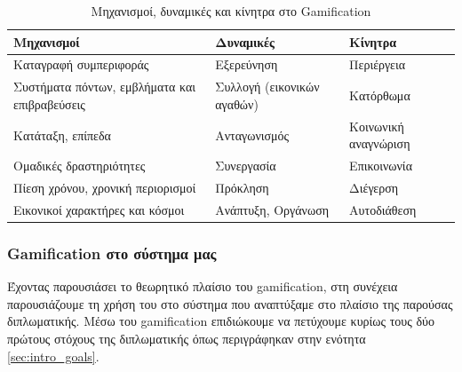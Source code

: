	\begin{table}[H]
		\begin{center}
		    \begin{tabular}{|l|l|l|}
		    \hline
		    \rowcolor{grayy}
		    \textbf{Μηχανισμοί} & \textbf{Δυναμικές} & \textbf{Κίνητρα}
		    \\ \hline
		     Καταγραφή συμπεριφοράς & Εξερεύνηση & Περιέργεια   
		     \\ \hline
		     Συστήματα πόντων, εμβλήματα και επιβραβεύσεις & Συλλογή (εικονικών αγαθών) & Κατόρθωμα
		     \\ \hline
		     Κατάταξη, επίπεδα & Ανταγωνισμός & Κοινωνική αναγνώριση
		     \\ \hline
		     Ομαδικές δραστηριότητες & Συνεργασία & Επικοινωνία
		     \\ \hline
		     Πίεση χρόνου, χρονική περιορισμοί & Πρόκληση & Διέγερση
		     \\ \hline
		     Εικονικοί χαρακτήρες και κόσμοι & Ανάπτυξη, Οργάνωση & Αυτοδιάθεση
		     \\ \hline
		    \end{tabular}
		    \caption{Μηχανισμοί, δυναμικές και κίνητρα στο Gamification}
			\label{tab:gamifaction_dynamics}
		\end{center}
	\end{table}
	
	\subsubsection{Gamification στο σύστημα μας}
		Έχοντας παρουσιάσει το θεωρητικό πλαίσιο του gamification, στη συνέχεια παρουσιάζουμε τη χρήση του στο σύστημα που αναπτύξαμε στο πλαίσιο της παρούσας διπλωματικής. Μέσω του gamification επιδιώκουμε να πετύχουμε κυρίως τους δύο πρώτους στόχους της διπλωματικής όπως περιγράφηκαν στην ενότητα \ref{sec:intro_goals}.
		
